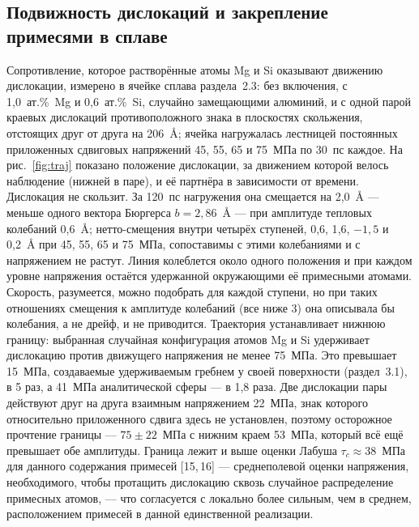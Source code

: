 \subsection{Подвижность дислокаций и закрепление примесями в сплаве}

Сопротивление, которое растворённые атомы Mg и Si оказывают движению
дислокации, измерено в ячейке сплава раздела~2.3: без включения, с
1{,}0~ат.\%~Mg и 0{,}6~ат.\%~Si, случайно замещающими алюминий, и с одной
парой краевых дислокаций противоположного знака в плоскостях скольжения,
отстоящих друг от друга на 206~\AA{}; ячейка нагружалась лестницей
постоянных приложенных сдвиговых напряжений 45, 55, 65 и 75~МПа по 30~пс
каждое. На рис.~\ref{fig:traj} показано положение дислокации, за движением
которой велось наблюдение (нижней в паре), и её партнёра в зависимости от
времени. Дислокация не скользит. За 120~пс нагружения она смещается на
2{,}0~\AA{} --- меньше одного вектора Бюргерса $b = 2{,}86$~\AA{} --- при
амплитуде тепловых колебаний 0{,}6~\AA{}; нетто-смещения внутри четырёх
ступеней, 0{,}6, 1{,}6, $-1{,}5$ и 0{,}2~\AA{} при 45, 55, 65 и 75~МПа,
сопоставимы с этими колебаниями и с напряжением не растут. Линия колеблется
около одного положения и при каждом уровне напряжения остаётся удержанной
окружающими её примесными атомами. Скорость, разумеется, можно подобрать
для каждой ступени, но при таких отношениях смещения к амплитуде колебаний
(все ниже 3) она описывала бы колебания, а не дрейф, и не приводится.
Траектория устанавливает нижнюю границу: выбранная случайная конфигурация
атомов Mg и Si удерживает дислокацию против движущего напряжения не менее
75~МПа. Это превышает 15~МПа, создаваемые удерживаемым гребнем у
своей поверхности (раздел~3.1), в 5 раз, а 41~МПа
аналитической сферы --- в 1{,}8 раза. Две дислокации пары действуют друг на
друга взаимным напряжением 22~МПа, знак которого относительно приложенного
сдвига здесь не установлен, поэтому осторожное прочтение границы ---
$75 \pm 22$~МПа с нижним краем 53~МПа, который всё ещё превышает обе
амплитуды. Граница лежит и выше оценки Лабуша
$\tau_c \approx 38$~МПа для данного содержания примесей [15,\,16] ---
среднеполевой оценки напряжения, необходимого, чтобы протащить дислокацию
сквозь случайное распределение примесных атомов, --- что согласуется с
локально более сильным, чем в среднем, расположением примесей в данной
единственной реализации.

